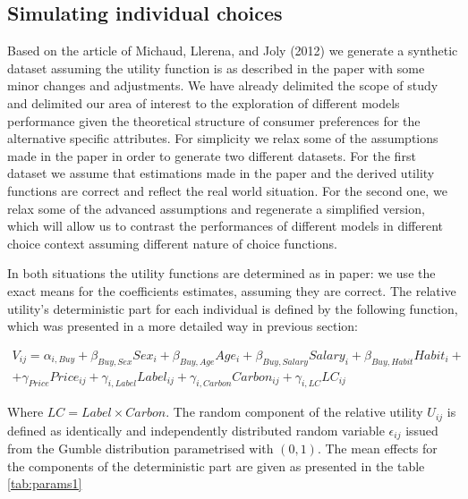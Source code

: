 \documentclass[11pt,]{article}
\title{}
\author{}
\date{}
\begin{document}
\hypertarget{simulating-individual-choices}{%
\subsection{Simulating individual
choices}\label{simulating-individual-choices}}

Based on the article of Michaud, Llerena, and Joly (2012) we generate a
synthetic dataset assuming the utility function is as described in the
paper with some minor changes and adjustments. We have already delimited
the scope of study and delimited our area of interest to the exploration
of different models performance given the theoretical structure of
consumer preferences for the alternative specific attributes. For
simplicity we relax some of the assumptions made in the paper in order
to generate two different datasets. For the first dataset we assume that
estimations made in the paper and the derived utility functions are
correct and reflect the real world situation. For the second one, we
relax some of the advanced assumptions and regenerate a simplified
version, which will allow us to contrast the performances of different
models in different choice context assuming different nature of choice
functions.

In both situations the utility functions are determined as in paper: we
use the exact means for the coefficients estimates, assuming they are
correct. The relative utility's deterministic part for each individual
is defined by the following function, which was presented in a more
detailed way in previous section:

\begin{multline}
V_{ij} = \alpha_{i,Buy} + \beta_{Buy, Sex} Sex_i + \beta_{Buy, Age} Age_i + \beta_{Buy, Salary} Salary_i + \beta_{Buy, Habit} Habit_i + \\
+ \gamma_{Price} Price_{ij} + \gamma_{i, Label} Label_{ij} + \gamma_{i, Carbon} Carbon_{ij} + \gamma_{i, LC} LC_{ij}
\end{multline}

Where \(LC = Label \times Carbon\). The random component of the relative
utility \(U_{ij}\) is defined as identically and independently
distributed random variable \(\epsilon_{ij}\) issued from the Gumble
distribution parametrised with \((0, 1)\). The mean effects for the
components of the deterministic part are given as presented in the table
\ref{tab:params1}
\end{document}
